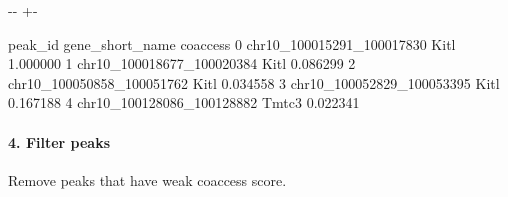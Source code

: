 \documentclass[letterpaper,10pt,english]{sphinxmanual}
\newlength\nbsphinxcodecellspacing
\begin{document}
{

\kern-\sphinxverbatimsmallskipamount\kern-\baselineskip
\kern+\FrameHeightAdjust\kern-\fboxrule
\vspace{\nbsphinxcodecellspacing}

\begin{sphinxVerbatim}[commandchars=\\\{\}]
\llap{\color{nbsphinxout}[8]:\,\hspace{\fboxrule}\hspace{\fboxsep}}                     peak\_id gene\_short\_name  coaccess
0  chr10\_100015291\_100017830            Kitl  1.000000
1  chr10\_100018677\_100020384            Kitl  0.086299
2  chr10\_100050858\_100051762            Kitl  0.034558
3  chr10\_100052829\_100053395            Kitl  0.167188
4  chr10\_100128086\_100128882           Tmtc3  0.022341
\end{sphinxVerbatim}
}


\paragraph{4. Filter peaks}
\label{\detokenize{notebooks/01_ATAC-seq_data_processing/option1_scATAC-seq_data_analysis_with_cicero/02_preprocess_peak_data:4.-Filter-peaks}}
Remove peaks that have weak coaccess score.

{
\begin{sphinxVerbatim}[commandchars=\\\{\}]
\llap{\color{nbsphinxin}[9]:\,\hspace{\fboxrule}\hspace{\fboxsep}}  \PYG{p}{[}  \PYG{p}{]}
  \PYG{p}{[}\PYG{p}{[} \PYG{p}{]}\PYG{p}{]}
\end{sphinxVerbatim}
}

{
\begin{sphinxVerbatim}[commandchars=\\\{\}]
\llap{\color{nbsphinxin}[10]:\,\hspace{\fboxrule}\hspace{\fboxsep}}
\end{sphinxVerbatim}
}
\end{document}
